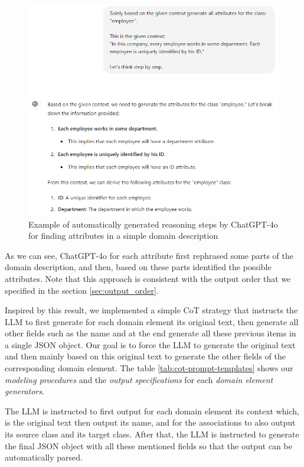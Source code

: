 \begin{figure}[!h]
    \centering
    \includegraphics[scale=0.6]{img/cot-think-step-by-step.png}
    \caption{\centering Example of automatically generated reasoning steps by ChatGPT-4o for finding attributes in a simple domain description}
    \label{fig:cot-think-step-by-step}
\end{figure}

As we can see, ChatGPT-4o for each attribute first rephrased some parts of the domain description, and then, based on these parts identified the possible attributes. Note that this approach is consistent with the output order that we specified in the section \ref{sec:output_order}.

Inspired by this result, we implemented a simple CoT strategy that instructs the LLM to first generate for each domain element its original text, then generate all other fields such as the name and at the end generate all these previous items in a single JSON object. Our goal is to force the LLM to generate the original text and then mainly based on this original text to generate the other fields of the corresponding domain element.
The table \ref{tab:cot-prompt-templates} shows our \emph{modeling procedures} and the \emph{output specifications} for each \emph{domain element generators}.

The LLM is instructed to first output for each domain element its context which, is the original text then output its name, and for the associations to also output its source class and its target class. After that, the LLM is instructed to generate the final JSON object with all these mentioned fields so that the output can be automatically parsed.

